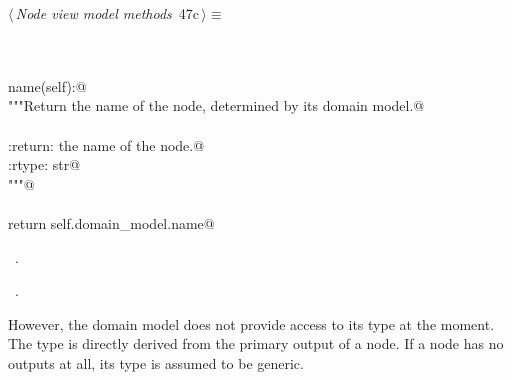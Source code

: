 \documentclass[
    a4paper,      %
    10pt,         %
    openright,    %
    notitlepage,  %
    parskip=half, %
]{scrreprt}       %
\theoremstyle{definition}                    %
\begin{document}
\begin{flushleft} \small
\begin{minipage}{\linewidth}\label{scrap62}\raggedright\small
{} $\langle\,${\itshape Node view model methods}\nobreak\ {\footnotesize {47c}}$\,\rangle\equiv$
\vspace{-1exm}
\begin{list}{}{} \item
\mbox{}\lstinline@@\\
\mbox{}\lstinline@property@\\
\mbox{}\lstinline@def name(self):@\\
\mbox{}\lstinline@    """Return the name of the node, determined by its domain model.@\\
\mbox{}\lstinline@@\\
\mbox{}\lstinline@    :return: the name of the node.@\\
\mbox{}\lstinline@    :rtype: str@\\
\mbox{}\lstinline@    """@\\
\mbox{}\lstinline@@\\
\mbox{}\lstinline@    return self.domain_model.name@\\
\mbox{}\lstinline@@{\NWsep}
\end{list}
\vspace{-1.5ex}
\footnotesize
\begin{list}{}{\setlength{\itemsep}{-\parsep}\setlength{\itemindent}{-\leftmargin}}
\item \NWtxtMacroDefBy\ .
\item \NWtxtMacroRefIn\ .

\item{}
\end{list}
\end{minipage}\vspace{4ex}
\end{flushleft}
However, the domain model does not provide access to its type at the moment. The
type is directly derived from the primary output of a node. If a node has no
outputs at all, its type is assumed to be generic.
\end{document}

